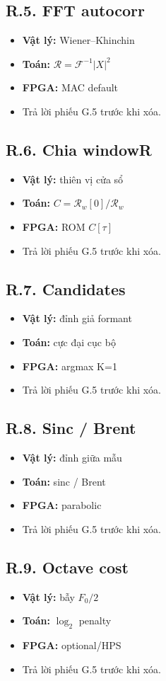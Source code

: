 \subsection*{R.5. FFT autocorr}
\begin{itemize}\setlength{\itemsep}{2pt}
\item \textbf{Vật lý:} Wiener--Khinchin
\item \textbf{Toán:} $\mathcal{R}=\mathcal{F}^{-1}|X|^2$
\item \textbf{FPGA:} MAC default
\item Trả lời phiếu G.5 trước khi xóa.
\end{itemize}
\subsection*{R.6. Chia windowR}
\begin{itemize}\setlength{\itemsep}{2pt}
\item \textbf{Vật lý:} thiên vị cửa sổ
\item \textbf{Toán:} $C=\mathcal{R}_w[0]/\mathcal{R}_w$
\item \textbf{FPGA:} ROM $C[\tau]$
\item Trả lời phiếu G.5 trước khi xóa.
\end{itemize}
\subsection*{R.7. Candidates}
\begin{itemize}\setlength{\itemsep}{2pt}
\item \textbf{Vật lý:} đỉnh giả formant
\item \textbf{Toán:} cực đại cục bộ
\item \textbf{FPGA:} argmax K=1
\item Trả lời phiếu G.5 trước khi xóa.
\end{itemize}
\subsection*{R.8. Sinc / Brent}
\begin{itemize}\setlength{\itemsep}{2pt}
\item \textbf{Vật lý:} đỉnh giữa mẫu
\item \textbf{Toán:} sinc / Brent
\item \textbf{FPGA:} parabolic
\item Trả lời phiếu G.5 trước khi xóa.
\end{itemize}
\subsection*{R.9. Octave cost}
\begin{itemize}\setlength{\itemsep}{2pt}
\item \textbf{Vật lý:} bẫy $F_0/2$
\item \textbf{Toán:} $\log_2$ penalty
\item \textbf{FPGA:} optional/HPS
\item Trả lời phiếu G.5 trước khi xóa.
\end{itemize}
